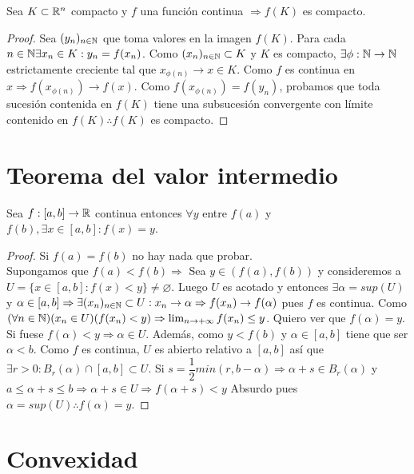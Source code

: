 \begin{theorem}
  Sea $K \subset \mathbb{R}^n$ compacto y $f$ una función continua $\Rightarrow f(K)$ es compacto.
  \begin{proof}
    Sea $(y_n)_{n \in \mathbb{N}}$ que toma valores en la imagen $f(K)$. Para cada $n \in \mathbb{N} \exists x_n \in K : y_n = f(x_n)$. Como $(x_n)_{n \in \mathbb{N}} \subset K$ y $K$ es compacto, $\exists \phi : \mathbb{N} \to \mathbb{N}$ estrictamente creciente tal que $x_{\phi(n)} \to x \in K$. Como $f$ es continua en $x \Rightarrow f(x_{\phi(n)}) \to f(x)$. Como $f(x_{\phi(n)}) = f(y_n)$, probamos que toda sucesión contenida en $f(K)$ tiene una subsucesión convergente con límite contenido en $f(K) \therefore f(K)$ es compacto.
  \end{proof}
\end{theorem}

\section{Teorema del valor intermedio}

\begin{theorem}
  Sea $f: [a, b] \to \mathbb{R}$ continua entonces $\forall y$ entre $f(a)$ y $f(b), \exists x \in [a, b] : f(x) = y$.

  \begin{proof}
    Si $f(a) = f(b)$ no hay nada que probar. \\
    Supongamos que $f(a) < f(b) \Rightarrow$ Sea $y \in (f(a), f(b))$ y consideremos a $U = \{ x \in [a, b] : f(x) < y \} \neq \varnothing$. Luego $U$ es acotado y entonces $\exists \alpha = sup(U)$ y $\alpha \in [a, b] \Rightarrow \exists (x_n)_{n \in \mathbb{N}} \subset U : x_n \to \alpha \Rightarrow f(x_n) \to f(\alpha)$ pues $f$ es continua. Como $(\forall n \in \mathbb{N})(x_n \in U)(f(x_n) < y) \Rightarrow \lim_{n \to +\infty} f(x_n) \leq y$. Quiero ver que $f(\alpha) = y$. Si fuese $f(\alpha) < y \Rightarrow \alpha \in U$. Además, como $y < f(b)$ y $\alpha \in [a, b]$ tiene que ser $\alpha < b$. Como $f$ es continua, $U$ es abierto relativo a $[a, b]$ así que $\exists r > 0 : B_r(\alpha) \cap [a, b] \subset U$. Si $s = \dfrac{1}{2} min(r, b-\alpha) \Rightarrow \alpha + s \in B_r(\alpha)$ y $a \leq \alpha + s \leq b \Rightarrow \alpha + s \in U \Rightarrow f(\alpha + s) < y$ Absurdo pues $\alpha = sup(U) \therefore f(\alpha) = y$.
  \end{proof}
\end{theorem}

\section{Convexidad}

